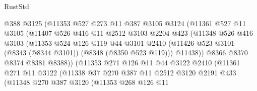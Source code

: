 \begin{lexlean}{RustStd}
\begin{coremodule}
{\begin{coremodule}
{{{{{{{{{{{{{{{{{{{{{{{{{{{{{{{{{{{{{{{{{{{{{{{{{{                        @388
                        @3125
                        (@11353
                          @527
                          @273
                          @11
                          @387
                          @3105
                          @3124
                          (@11361
                            @527
                            @11
                            @3105
                            (@11407
                              @526
                              @416
                              @11
                              @2512
                              @3103
                              @2204
                              @423
                              (@11348
                                @526
                                @416
                                @3103
                                (@11353
                                  @524
                                  @126
                                  @119
                                  @44
                                  @3101
                                  @2410
                                  (@11426
                                    @523
                                    @3101
                                    (@8343 (@8344 @3101))
                                    (@8348 (@8350 @523 @119)))
                                  @11438))
                              @8366
                              @8370
                              @8374
                              @8381
                              @8388))
                          (@11353
                            @271
                            @126
                            @11
                            @44
                            @3122
                            @2410
                            (@11361
                              @271
                              @11
                              @3122
                              (@11338
                                @37
                                @270
                                @387
                                @11
                                @2512
                                @3120
                                @2191
                                @433
                                (@11348
                                  @270
                                  @387
                                  @3120
                                  (@11353
                                    @268
                                    @126
                                    @11
}}}}}}}}}}}}}}}}}}}}}}}}}}}}}}}}}}}}}}}}}}}}}}}}}}
\end{coremodule}}
\end{coremodule}
\end{lexlean}
